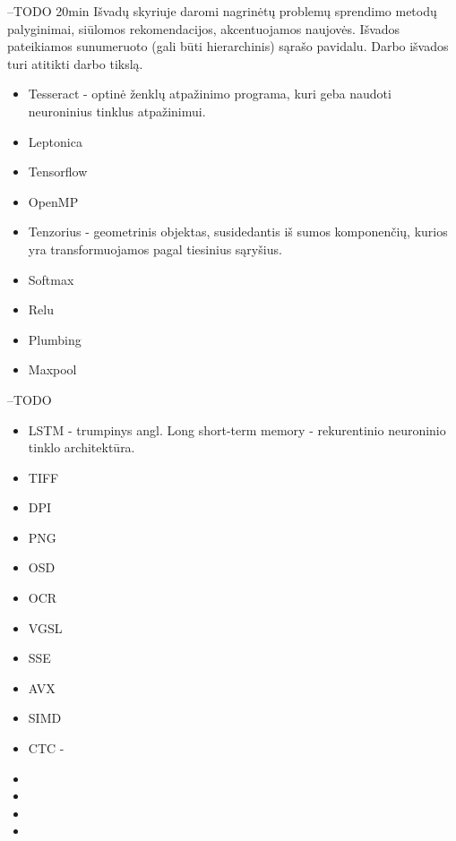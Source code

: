 \documentclass{VUMIFInfBakalaurinis}
\begin{document}
--TODO 20min
Išvadų skyriuje daromi nagrinėtų problemų sprendimo metodų palyginimai, siūlomos
rekomendacijos, akcentuojamos naujovės. Išvados pateikiamos sunumeruoto (gali būti
hierarchinis) sąrašo pavidalu. Darbo išvados turi atitikti darbo tikslą. 

\pagebreak
\printbibliography[heading=bibintoc]

\pagebreak
{}
\begin{itemize}
  \item Tesseract - optinė ženklų atpažinimo programa, kuri geba naudoti neuroninius tinklus atpažinimui.
  \item Leptonica
  \item Tensorflow
  \item OpenMP
  \item Tenzorius - geometrinis objektas, susidedantis iš sumos komponenčių, kurios yra transformuojamos pagal tiesinius sąryšius.
  \item Softmax
  \item Relu
  \item Plumbing
  \item Maxpool
\end{itemize}

--TODO
\begin{itemize}
  \item LSTM - trumpinys angl. Long short-term memory - rekurentinio neuroninio tinklo architektūra.
  \item TIFF
  \item DPI
  \item PNG
  \item OSD
  \item OCR
  \item VGSL
  \item SSE
  \item AVX
  \item SIMD
  \item CTC - %
  \item 
  \item 
  \item 
  \item 
\end{itemize}

\appendix  %
\end{document}
